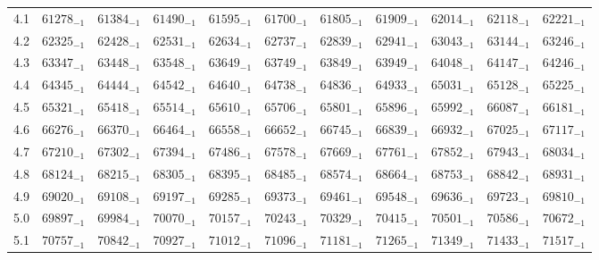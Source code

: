 \documentclass[10pt, a4paper]{article}
\begin{document}
\begin{center}
\begin{longtable}{c || c c c c c | c c c c c}
        4.1 & \({61278}_{-1}\) & \({61384}_{-1}\) & \({61490}_{-1}\) & \({61595}_{-1}\) & \({61700}_{-1}\) & \({61805}_{-1}\) & \({61909}_{-1}\) & \({62014}_{-1}\) & \({62118}_{-1}\) & \({62221}_{-1}\)\\
        4.2 & \({62325}_{-1}\) & \({62428}_{-1}\) & \({62531}_{-1}\) & \({62634}_{-1}\) & \({62737}_{-1}\) & \({62839}_{-1}\) & \({62941}_{-1}\) & \({63043}_{-1}\) & \({63144}_{-1}\) & \({63246}_{-1}\)\\
        4.3 & \({63347}_{-1}\) & \({63448}_{-1}\) & \({63548}_{-1}\) & \({63649}_{-1}\) & \({63749}_{-1}\) & \({63849}_{-1}\) & \({63949}_{-1}\) & \({64048}_{-1}\) & \({64147}_{-1}\) & \({64246}_{-1}\)\\
        4.4 & \({64345}_{-1}\) & \({64444}_{-1}\) & \({64542}_{-1}\) & \({64640}_{-1}\) & \({64738}_{-1}\) & \({64836}_{-1}\) & \({64933}_{-1}\) & \({65031}_{-1}\) & \({65128}_{-1}\) & \({65225}_{-1}\)\\
        4.5 & \({65321}_{-1}\) & \({65418}_{-1}\) & \({65514}_{-1}\) & \({65610}_{-1}\) & \({65706}_{-1}\) & \({65801}_{-1}\) & \({65896}_{-1}\) & \({65992}_{-1}\) & \({66087}_{-1}\) & \({66181}_{-1}\)\\
        4.6 & \({66276}_{-1}\) & \({66370}_{-1}\) & \({66464}_{-1}\) & \({66558}_{-1}\) & \({66652}_{-1}\) & \({66745}_{-1}\) & \({66839}_{-1}\) & \({66932}_{-1}\) & \({67025}_{-1}\) & \({67117}_{-1}\)\\
        4.7 & \({67210}_{-1}\) & \({67302}_{-1}\) & \({67394}_{-1}\) & \({67486}_{-1}\) & \({67578}_{-1}\) & \({67669}_{-1}\) & \({67761}_{-1}\) & \({67852}_{-1}\) & \({67943}_{-1}\) & \({68034}_{-1}\)\\
        4.8 & \({68124}_{-1}\) & \({68215}_{-1}\) & \({68305}_{-1}\) & \({68395}_{-1}\) & \({68485}_{-1}\) & \({68574}_{-1}\) & \({68664}_{-1}\) & \({68753}_{-1}\) & \({68842}_{-1}\) & \({68931}_{-1}\)\\
        4.9 & \({69020}_{-1}\) & \({69108}_{-1}\) & \({69197}_{-1}\) & \({69285}_{-1}\) & \({69373}_{-1}\) & \({69461}_{-1}\) & \({69548}_{-1}\) & \({69636}_{-1}\) & \({69723}_{-1}\) & \({69810}_{-1}\)\\
        5.0 & \({69897}_{-1}\) & \({69984}_{-1}\) & \({70070}_{-1}\) & \({70157}_{-1}\) & \({70243}_{-1}\) & \({70329}_{-1}\) & \({70415}_{-1}\) & \({70501}_{-1}\) & \({70586}_{-1}\) & \({70672}_{-1}\)\\
        5.1 & \({70757}_{-1}\) & \({70842}_{-1}\) & \({70927}_{-1}\) & \({71012}_{-1}\) & \({71096}_{-1}\) & \({71181}_{-1}\) & \({71265}_{-1}\) & \({71349}_{-1}\) & \({71433}_{-1}\) & \({71517}_{-1}\)\\

\end{longtable}
\end{center}
\end{document}
